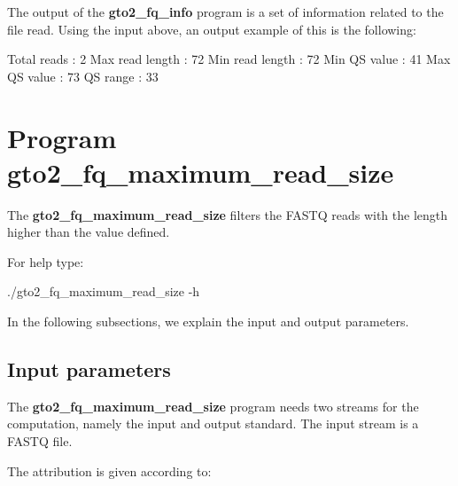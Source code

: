 \documentclass[11pt,]{krantz}
\newenvironment{Shaded}{\begin{snugshade}}{\end{snugshade}}
\newcommand{\ExtensionTok}[1]{#1}
\newcommand{\NormalTok}[1]{#1}
\begin{document}
The output of the \textbf{gto2\_fq\_info} program is a set of
information related to the file read. Using the input above, an output
example of this is the following:

\begin{Shaded}
\begin{Highlighting}[]
\ExtensionTok{Total}\NormalTok{ reads     : 2}
\ExtensionTok{Max}\NormalTok{ read length : 72}
\ExtensionTok{Min}\NormalTok{ read length : 72}
\ExtensionTok{Min}\NormalTok{ QS value    : 41}
\ExtensionTok{Max}\NormalTok{ QS value    : 73}
\ExtensionTok{QS}\NormalTok{ range        : 33}
\end{Highlighting}
\end{Shaded}

\section{Program
gto2\_fq\_maximum\_read\_size}\label{program-gto2_fq_maximum_read_size}

The \textbf{gto2\_fq\_maximum\_read\_size} filters the FASTQ reads with
the length higher than the value defined.

For help type:

\begin{Shaded}
\begin{Highlighting}[]
\ExtensionTok{./gto2_fq_maximum_read_size}\NormalTok{ -h}
\end{Highlighting}
\end{Shaded}

In the following subsections, we explain the input and output
parameters.

\subsection*{Input parameters}\label{input-parameters-5}


The \textbf{gto2\_fq\_maximum\_read\_size} program needs two streams for
the computation, namely the input and output standard. The input stream
is a FASTQ file.

The attribution is given according to:
\end{document}
